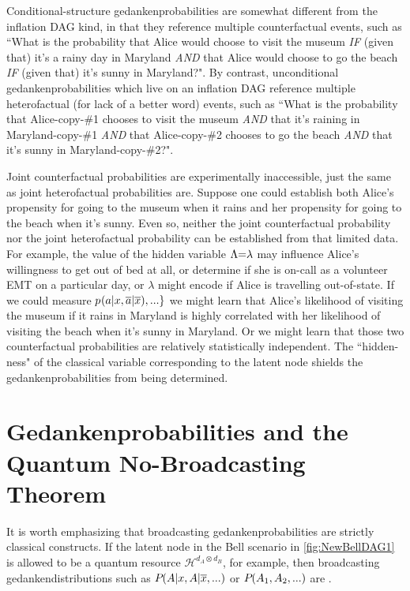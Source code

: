 Conditional-structure gedankenprobabilities are somewhat different from the inflation DAG kind, in that they reference multiple counterfactual events, such as ``What is the probability that Alice would choose to visit the museum \emph{IF} (given that) it's a rainy day in Maryland \emph{AND} that Alice would choose to go the beach \emph{IF} (given that) it's sunny in Maryland?". By contrast, unconditional gedankenprobabilities which live on an inflation DAG reference multiple heterofactual (for lack of a better word) events, such as ``What is the probability that Alice-copy-\#1 chooses to visit the museum \emph{AND} that it's raining in Maryland-copy-\#1 \emph{AND} that Alice-copy-\#2 chooses to go the beach \emph{AND} that it's sunny in Maryland-copy-\#2?". 

Joint counterfactual probabilities are experimentally inaccessible, just the same as joint heterofactual probabilities are. Suppose one could establish both Alice's propensity for going to the museum when it rains and her propensity for going to the beach when it's sunny. Even so, neither the joint counterfactual probability nor the joint heterofactual probability can be established from that limited data. For example, the value of the hidden variable ${\Lambda\mathord{=}\lambda}$ may influence Alice's willingness to get out of bed at all, or determine if she is on-call as a volunteer EMT on a particular day, or $\lambda$ might encode if Alice is travelling out-of-state. If we could measure ${p_{}}\lparen a|x , \overline{a}|\overline{x}\rparen,...\}$ we might learn that Alice's likelihood of visiting the museum if it rains in Maryland is highly correlated with her likelihood of visiting the beach when it's sunny in Maryland. Or we might learn that those two counterfactual probabilities are relatively statistically independent. The ``hidden-ness" of the classical variable corresponding to the latent node shields the gedankenprobabilities from being determined. 


\section{Gedankenprobabilities and the Quantum No-Broadcasting Theorem}\label{sec:classicallity}

It is worth emphasizing that broadcasting gedankenprobabilities %
are strictly classical constructs. If the latent node in the Bell scenario in \cref{fig:NewBellDAG1} is allowed to be a quantum resource $\mathcal{H}^{d_A\otimes d_B}$, for example, then broadcasting gedankendistributions such as ${P_{}}\lparen A|x , A|\overline{x},...\rparen$ or ${P_{}}\lparen A_1,A_2,...\rparen$ are . 

